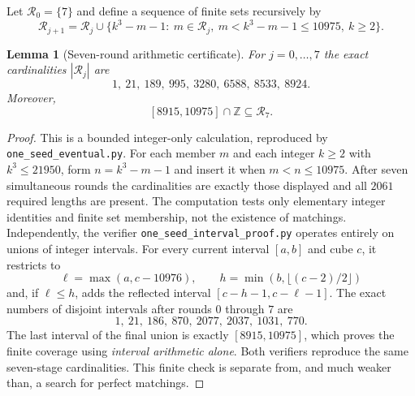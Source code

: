 \documentclass[10pt]{article}
\newtheorem{lemma}{Lemma}
\begin{document}
Let $\mathcal R_0=\{7\}$ and define a
sequence of finite sets recursively by
\begin{equation}\label{eq:sevenrounds}
\mathcal R_{j+1}=\mathcal R_j\cup
\{k^3-m-1:\ m\in\mathcal R_j,\
m<k^3-m-1\le10975,\ k\ge2\}.
\end{equation}

\begin{lemma}[Seven-round arithmetic certificate]
\label{lem:sevenrounds}
For $j=0,\ldots,7$ the exact cardinalities
$|\mathcal R_j|$ are
\[
1,\ 21,\ 189,\ 995,\ 3280,\ 6588,\ 8533,\ 8924.
\]
Moreover,
\[
\boxed{[8915,10975]\cap\mathbb Z
\subseteq\mathcal R_7.}
\]
\end{lemma}
\begin{proof}
This is a bounded integer-only calculation,
reproduced by \texttt{one\_seed\_eventual.py}.
For each member $m$ and each integer
$k\ge2$ with $k^3\le21950$,
form $n=k^3-m-1$ and insert it
when $m<n\le10975$. After seven
simultaneous rounds the cardinalities
are exactly those displayed and all
$2061$ required lengths are present.
The computation tests only elementary
integer identities and finite set
membership, not the existence of
matchings. Independently, the verifier
\texttt{one\_seed\_interval\_proof.py}
operates entirely on unions of integer
intervals. For every current interval
$[a,b]$ and cube $c$, it restricts to
\[
\ell=\max(a,c-10976),\qquad
h=\min(b,\lfloor(c-2)/2\rfloor)
\]
and, if $\ell\le h$, adds the reflected
interval $[c-h-1,c-\ell-1]$.
The exact numbers of disjoint intervals
after rounds $0$ through $7$ are
\[
1,\ 21,\ 186,\ 870,\ 2077,\ 2037,\ 1031,\ 770.
\]
The last interval of the final union
is exactly $[8915,10975]$, which proves
the finite coverage using \emph{interval
arithmetic alone}. Both verifiers
reproduce the same seven-stage cardinalities.
This finite check is separate from, and
much weaker than, a search for perfect
matchings.
\end{proof}
\end{document}
